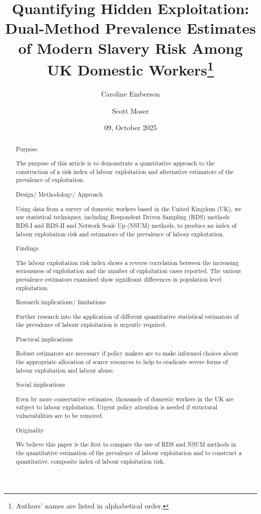 \documentclass[
  12pt,
  letterpaper,
  DIV=11,
  numbers=noendperiod]{scrartcl}
\title{Quantifying Hidden Exploitation: Dual-Method Prevalence Estimates
of Modern Slavery Risk Among UK Domestic Workers\footnote{Authors' names
  are listed in alphabetical order.}}
\author{Caroline Emberson \and Scott Moser}
\date{09, October 2025}
\theoremstyle{plain}
\theoremstyle{definition}
\renewcommand*\contentsname{Table of contents}
\newcommand\contentsname{Table of contents}
\begin{document}
\maketitle
\begin{abstract}
Purpose

The purpose of this article is to demonstrate a quantitative approach to
the construction of a risk index of labour exploitation and alternative
estimators of the prevalence of exploitation.

Design/ Methodology/ Approach

Using data from a survey of domestic workers based in the United Kingdom
(UK), we use statistical techniques, including Respondent Driven
Sampling (RDS) methods RDS-I and RDS-II and Network Scale Up (NSUM)
methods, to produce an index of labour exploitation risk and estimators
of the prevalence of labour exploitation.

Findings

The labour exploitation risk index shows a reverse correlation between
the increasing seriousness of exploitation and the number of
exploitation cases reported. The various prevalence estimators examined
show significant differences in population level exploitation.

Research implications/ limitations

Further research into the application of different quantitative
statistical estimators of the prevalence of labour exploitation is
urgently required.

Practical implications

Robust estimators are necessary if policy makers are to make informed
choices about the appropriate allocation of scarce resources to help to
eradicate severe forms of labour exploitation and labour abuse.

Social implications

Even by more conservative estimates, thousands of domestic workers in
the UK are subject to labour exploitation. Urgent policy attention is
needed if structural vulnerabilities are to be removed.

Originality

We believe this paper is the first to compare the use of RDS and NSUM
methods in the quantitative estimation of the prevalence of labour
exploitation and to construct a quantitative, composite index of labour
exploitation risk.
\end{abstract}

\renewcommand*\contentsname{Table of contents}
{
\hypersetup{linkcolor=}
\setcounter{tocdepth}{3}
\tableofcontents
}
\end{document}

